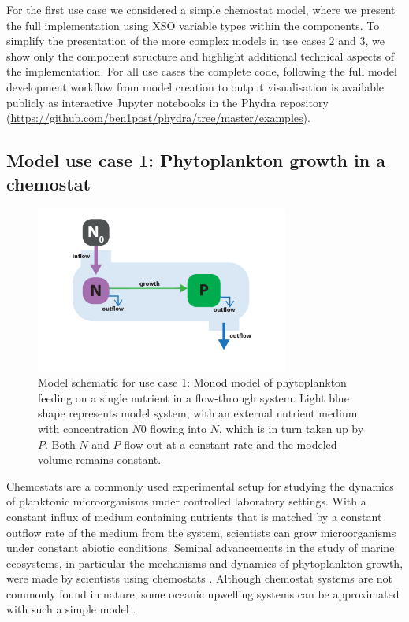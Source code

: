 \documentclass[journal abbreviation, manuscript]{copernicus}
\begin{document}
For the first use case we considered a simple chemostat model, where we present the full implementation using XSO variable types within the components. To simplify the presentation of the more complex models in use cases 2 and 3, we show only the component structure and highlight additional technical aspects of the implementation. For all use cases the complete code, following the full model development workflow from model creation to output visualisation is available publicly as interactive Jupyter notebooks in the Phydra repository (\url{https://github.com/ben1post/phydra/tree/master/examples}).

\subsection{Model use case 1: Phytoplankton growth in a chemostat}

\begin{figure}[t]
\includegraphics[width=8.3cm]{Figures/firstdraft_schematics/01_schematics_Chemostat.pdf}
\caption{Model schematic for use case 1: Monod model of phytoplankton feeding on a single nutrient in a flow-through system. Light blue shape represents model system, with an external nutrient medium with concentration $N0$ flowing into $N$, which is in turn taken up by $P$. Both $N$ and $P$ flow out at a constant rate and the modeled volume remains constant.}
\label{Figure:ModelSchematics_1}
\end{figure}

Chemostats are a commonly used experimental setup for studying the dynamics of planktonic microorganisms under controlled laboratory settings. With a constant influx of medium containing nutrients that is matched by a constant outflow rate of the medium from the system, scientists can grow microorganisms under constant abiotic conditions. Seminal advancements in the study of marine ecosystems, in particular the mechanisms and dynamics of phytoplankton growth, were made by scientists using chemostats \citep[e.g.,][]{Droop1968VitaminLutheri}. Although chemostat systems are not commonly found in nature, some oceanic upwelling systems can be approximated with such a simple model \citep{Haefner2005ModelingApplications}.
\end{document}
